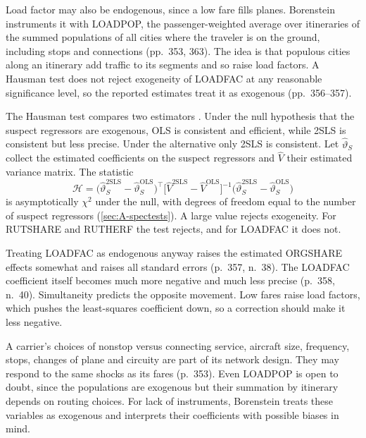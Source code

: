  Load factor may also be endogenous, since a low fare fills planes.
Borenstein instruments it with LOADPOP, the passenger-weighted average over itineraries of the summed
populations of all cities where the traveler is on the ground, including stops and connections (pp.~353, 363).
The idea is that populous cities along an itinerary add traffic to its segments and so raise load factors. A
Hausman test does not reject exogeneity of LOADFAC at any reasonable significance level, so the reported
estimates treat it as exogenous (pp.~356--357).

The Hausman test compares two estimators \citep{Hausman1978}. Under the null hypothesis that the suspect
regressors are exogenous, OLS is consistent and efficient, while 2SLS is consistent but less precise. Under the
alternative only 2SLS is consistent. Let $\hat\vartheta_S$ collect the estimated coefficients on the suspect
regressors and $\hat V$ their estimated variance matrix. The statistic
\begin{equation}\label{eq:09-bor-hausman}
\mathcal{H} = \big(\hat\vartheta_S^{\mathrm{2SLS}} - \hat\vartheta_S^{\mathrm{OLS}}\big)^\top
\big[\hat V^{\mathrm{2SLS}} - \hat V^{\mathrm{OLS}}\big]^{-1}
\big(\hat\vartheta_S^{\mathrm{2SLS}} - \hat\vartheta_S^{\mathrm{OLS}}\big)
\end{equation}
is asymptotically $\chi^2$ under the null, with degrees of freedom equal to the number of suspect regressors
(\cref{sec:A-spectests}). A large value rejects exogeneity. For RUTSHARE and RUTHERF the test rejects, and
for LOADFAC it does not.

Treating LOADFAC as endogenous anyway raises the estimated ORGSHARE effects somewhat and raises all standard
errors (p.~357, n.~38). The LOADFAC coefficient itself becomes much more negative and much less precise
(p.~358, n.~40). Simultaneity predicts the opposite movement. Low fares raise load factors, which pushes the
least-squares coefficient down, so a correction should make it less negative.

 A carrier's choices of nonstop versus connecting service, aircraft
size, frequency, stops, changes of plane and circuity are part of its network design. They may respond to the
same shocks as its fares (p.~353). Even LOADPOP is open to doubt, since the populations are exogenous but their
summation by itinerary depends on routing choices. For lack of instruments, Borenstein treats these variables as
exogenous and interprets their coefficients with possible biases in mind.

